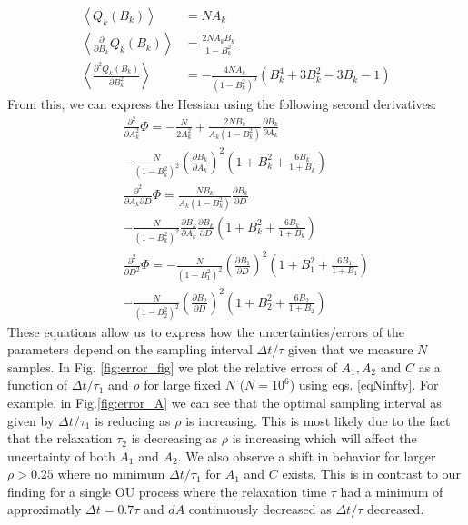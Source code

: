 \documentclass[%
 reprint,
 amsmath,amssymb,
 aps,
]{revtex4-1}
\begin{document}
\begin{equation}
	\begin{aligned}
	\left\langle Q_{k}(B_{k})\right\rangle &= NA_{k}\\
	\left\langle\frac{\partial}{\partial B_{k}}Q_{k}(B_{k})\right\rangle &=  \frac{2NA_{k}B_{k}}{1-B_{k}^{2}}\\
	\left\langle\frac{\partial^{2}Q_{k}(B_{k})}{\partial B_{k}^{2}}\right\rangle &= 
	-\frac{4NA_{k}}{(1-B_{k}^{2})^{3}}\left(B_{k}^{4}+3B_{k}^{2}-3B_{k}-1\right)
	\end{aligned}
\end{equation}
From this, we can express the Hessian using the following second derivatives:
\begin{eqnarray}\label{eqNinfty}
		&&\frac{\partial^{2}}{\partial A_{k}^2}\Phi = -\frac{N}{2A_{k}^{2}} +\frac{2NB_{k}}{A_{k}(1-B_{k}^{2})}\frac{\partial B_{k}}{\partial A_{k}}\\
		&&- \frac{N}{(1-B_{k}^{2})^{2}}\left(\frac{\partial B_{k}}{\partial A_{k}}\right)^{2}
		\left(1+B_{k}^{2}+\frac{6B_{k}}{1+B_{k}}\right)\nonumber\\
		&&\frac{\partial^{2}}{\partial A_{k}\partial D}\Phi =
		\frac{NB_{k}}{A_{k}(1-B_{k}^{2})}\frac{\partial B_{k}}{\partial D}\nonumber\\
		&&-\frac{N}{(1-B_{k}^{2})^{2}}\frac{\partial B_{k}}{\partial A_{k}}\frac{\partial B_{k}}{\partial D}
		\left(1+B_{k}^{2}+\frac{6B_{k}}{1+B_{k}}\right)\nonumber\\
		&&\frac{\partial^{2}}{\partial D^2}\Phi =
		- \frac{N}{(1-B_{1}^{2})^{2}}\left(\frac{\partial B_{1}}{\partial D}\right)^{2}
		\left(1+B_{1}^{2}+\frac{6B_{1}}{1+B_{1}}\right)\nonumber\\
		&&- \frac{N}{(1-B_{2}^{2})^{2}}\left(\frac{\partial B_{2}}{\partial D}\right)^{2}
		\left(1+B_{2}^{2}+\frac{6B_{2}}{1+B_{2}}\right)\nonumber
\end{eqnarray}
These equations allow us to express how the uncertainties/errors of the parameters depend on the sampling interval $\Delta t/\tau$ given that we measure $N$ samples.  In Fig. \ref{fig:error_fig} we plot the relative errors of $A_{1},A_{2}$ and $C$ as a function of $\Delta t/\tau_{1}$ and $\rho$ for large fixed $N$ ($N=10^{6}$) using eqs. \ref{eqNinfty}.  For example, in Fig.\ref{fig:error_A} we can see that the optimal sampling interval as given by $\Delta t/\tau_{1}$ is reducing as $\rho$ is increasing.  This is most likely due to the fact that the relaxation $\tau_{2}$ is decreasing as $\rho$ is increasing which will affect the uncertainty of both $A_{1}$ and $A_{2}$.  We also observe a shift in behavior for larger $\rho>0.25$ where no minimum $\Delta t/\tau_{1}$ for $A_{1}$ and $C$ exists.  This is in contrast to our finding for a single OU process \cite{RN91} where the relaxation time $\tau$ had a minimum of approximatly $\Delta t = 0.7\tau$ and $dA$ continuously decreased as $\Delta t/\tau$ decreased.
\end{document}
